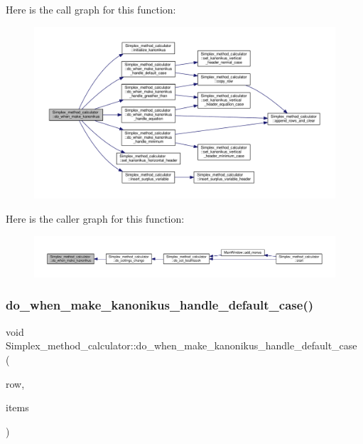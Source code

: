 Here is the call graph for this function\+:\nopagebreak
\begin{figure}[H]
\begin{center}
\leavevmode
\includegraphics[width=350pt]{classSimplex__method__calculator_a8455d20c883cc45b0c536da0dbe42405_cgraph}
\end{center}
\end{figure}
Here is the caller graph for this function\+:\nopagebreak
\begin{figure}[H]
\begin{center}
\leavevmode
\includegraphics[width=350pt]{classSimplex__method__calculator_a8455d20c883cc45b0c536da0dbe42405_icgraph}
\end{center}
\end{figure}
\mbox{\label{classSimplex__method__calculator_a8bd16d16283497488f78652ac559802d}} 
\subsubsection{\texorpdfstring{do\+\_\+when\+\_\+make\+\_\+kanonikus\+\_\+handle\+\_\+default\+\_\+case()}{do\_when\_make\_kanonikus\_handle\_default\_case()}}
{\footnotesize\ttfamily void Simplex\+\_\+method\+\_\+calculator\+::do\+\_\+when\+\_\+make\+\_\+kanonikus\+\_\+handle\+\_\+default\+\_\+case (\begin{DoxyParamCaption}\item[{int}]{row,  }\item[{Q\+List$<$ Q\+Standard\+Item $\ast$$>$}]{items }\end{DoxyParamCaption})\hspace{0.3cm}{\ttfamily [private]}}



